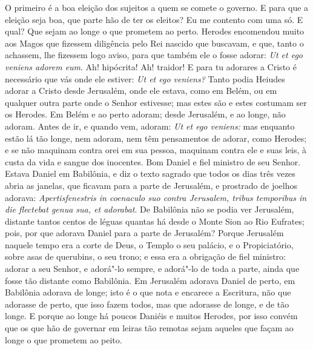 O primeiro é a boa eleição dos sujeitos a quem se comete o governo. E
para que a eleição seja boa, que parte hão de ter os eleitos? Eu me
contento com uma só. E qual? Que sejam ao longe o que prometem ao perto.
Herodes encomendou muito aos Magos que fizessem diligência pelo Rei
nascido que buscavam, e que, tanto o achassem, lhe fizessem logo aviso,
para que também ele o fosse adorar: \emph{Ut et ego veniens adorem eum}.
Ah! hipócrita! Ah! traidor! E para tu adorares a Cristo é
necessário que vás onde ele estiver: \emph{Ut et ego veniens?} Tanto
podia Heiudes adorar a Cristo desde Jerusalém, onde ele estava, como em
Belém, ou em qualquer outra parte onde o Senhor estivesse; mas estes são
e estes costumam ser os Herodes. Em Belém e ao perto adoram; desde
Jerusalém, e ao longe, não adoram. Antes de ir, e quando vem, adoram:
\emph{Ut et ego veniens:} mas enquanto estão lá tão longe, nem
adoram, nem têm pensamentos de adorar, como Herodes; e se não maquinam
contra orei em sua pessoa, maquinam contra ele e suas leis, à custa da
vida e sangue dos inocentes. Bom Daniel e fiel ministro de seu Senhor.
Estava Daniel em Babilônia, e diz o texto sagrado que todos os dias três
vezes abria as janelas, que ficavam para a parte de Jerusalém, e
prostrado de joelhos adorava: \emph{Apertisfenestris in coenaculo suo
contra Jerusalem, tribus temporibus in die flectebat genua sua, et
adorabat}. De Babilônia não se podia ver Jerusalém,
distante tantos centos de léguas quantas há desde o Monte Sion ao Rio
Eufrates; pois, por que adorava Daniel para a parte de Jerusalém? Porque
Jerusalém naquele tempo era a corte de Deus, o Templo o seu palácio, e o
Propiciatório, sobre asas de querubins, o seu trono; e essa era a
obrigação de fiel ministro: adorar a
seu Senhor, e adorá"-lo sempre, e adorá"-lo de toda a parte, ainda que
fosse tão distante como Babilônia. Em Jerusalém adorava Daniel de perto,
em Babilônia adorava de longe; isto é o que nota e encarece a Escritura,
não que adorasse de perto, que isso fazem todos, mas que adorasse de
longe, e de tão longe. E porque ao longe há poucos Daniéis e muitos
Herodes, por isso convém que os que hão de governar em leiras tão
remotas sejam aqueles que façam ao longe o que prometem ao peito.

